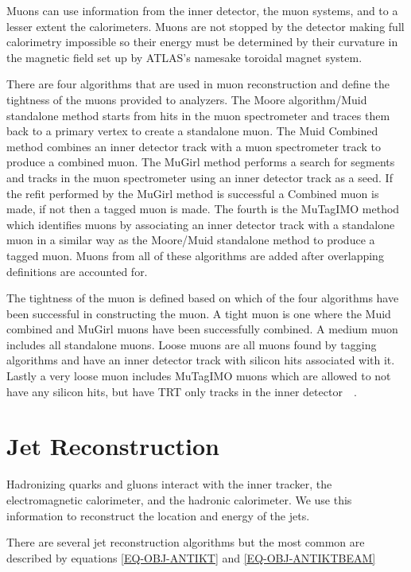 Muons can use information from the inner detector, the muon systems, and to a lesser extent the calorimeters. Muons are not stopped by the detector making full calorimetry impossible so their energy must be determined by their curvature in the magnetic field set up by ATLAS's namesake toroidal magnet system. 

There are four algorithms that are used in muon reconstruction and define the tightness of the muons provided to analyzers. The Moore algorithm/Muid standalone method starts from hits in the muon spectrometer and traces them back to a primary vertex to create a standalone muon. The Muid Combined method combines an inner detector track with a muon spectrometer track to produce a combined muon. The MuGirl method performs a search for segments and tracks in the muon spectrometer using an inner detector track as a seed. If the refit performed by the MuGirl method is successful a Combined muon is made, if not then a tagged muon is made. The fourth is the MuTagIMO method which identifies muons by associating an inner detector track with a standalone muon in a similar way as the Moore/Muid standalone method to produce a tagged muon. Muons from all of these algorithms are added after overlapping definitions are accounted for. 

The tightness of the muon is defined based on which of the four algorithms have been successful in constructing the muon. A tight muon is one where the Muid combined and MuGirl muons have been successfully combined. A medium muon includes all standalone muons. Loose muons are all muons found by tagging algorithms and have an inner detector track with silicon hits associated with it. Lastly a very loose muon includes MuTagIMO muons which are allowed to not have any silicon hits, but have TRT only tracks in the inner detector~\cite{Muons}~\cite{Aad:2016jkr}.


\section{Jet Reconstruction}
\label{SECTION-OBJ-JET}

Hadronizing quarks and gluons interact with the inner tracker, the electromagnetic calorimeter, and the hadronic calorimeter. We use this information to reconstruct the location and energy of the jets. 

There are several jet reconstruction algorithms but the most common are described by equations \ref{EQ-OBJ-ANTIKT} and \ref{EQ-OBJ-ANTIKTBEAM}

